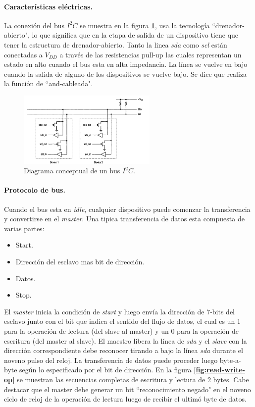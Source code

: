 \documentclass[11pt, a4paper]{article}
\begin{document}
			\paragraph{Características eléctricas.} La conexión del bus $I^{2}C$ se muestra en la figura \textcolor{blue}{\textbf{\ref{fig:electric_char}}}, usa la tecnología ``drenador-abierto", lo que significa que en la etapa de salida de un dispositivo tiene que tener la estructura de drenador-abierto. Tanto la linea \textit{sda} como \textit{scl} están conectadas a $V_{DD}$ a través de las resistencias pull-up las cuales representan un estado en alto cuando el bus esta en alta impedancia. La línea se vuelve en bajo cuando la salida de alguno de los dispositivos se vuelve bajo. Se dice que realiza la función de ``and-cableada".
		\begin{figure}[H]
			\centering
			\includegraphics[width=0.6\textwidth]{Imagenes/open-drain.png}
			\caption{Diagrama conceptual de un bus $I^{2}C$.}
			\label{fig:electric_char}
		\end{figure} 
		
		\paragraph{Protocolo de bus.} Cuando el bus esta en \textit{idle}, cualquier dispositivo puede comenzar la transferencia y convertirse en el \textit{master}. Una tipica transferencia de datos esta compuesta de varias partes:
		\begin{itemize}\itemsep 0em
			\item Start.
			\item Dirección del esclavo mas bit de dirección.
			\item Datos.
			\item Stop.
		\end{itemize}
		
		El \textit{master} inicia la condición de \textit{start} y luego envía la dirección de 7-bits del esclavo junto con el bit que indica el sentido del flujo de datos, el cual es un 1 para la operación de lectura (del slave al master) y un 0 para la operación de escritura (del master al slave). El maestro libera la línea de \textit{sda} y el \textit{slave} con la dirección correspondiente debe reconocer tirando a bajo la línea \textit{sda} durante el noveno pulso del reloj. La transferencia de datos puede proceder luego byte-a-byte según lo especificado por el bit de dirección. En la figura \textcolor{blue}{\textbf{\ref{fig:read-write-op}}} se muestran las secuencias completas de escritura y lectura de 2 bytes. Cabe destacar que el master debe generar un bit ``reconocimiento negado" en el noveno ciclo de reloj de la operación de lectura luego de recibir el ultimó byte de datos.
\end{document}
